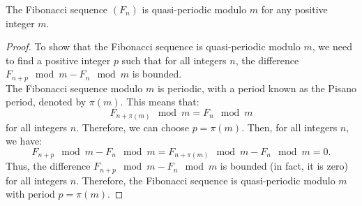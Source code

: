 \documentclass[openany]{book}
\begin{document}
\begin{mytheorem}
    The Fibonacci sequence $(F_n)$ is quasi-periodic modulo $m$ for any positive integer $m$.
\end{mytheorem}
\begin{proof}
    To show that the Fibonacci sequence is quasi-periodic modulo $m$, we need to find a positive integer $p$ such that for all integers $n$, the difference $F_{n+p} \mod m - F_n \mod m$ is bounded. \\
    The Fibonacci sequence modulo $m$ is periodic, with a period known as the Pisano period, denoted by $\pi(m)$. This means that:
    \[
        F_{n+\pi(m)} \mod m = F_n \mod m
    \]
    for all integers $n$. Therefore, we can choose $p = \pi(m)$. Then, for all integers $n$, we have:
    \[
        F_{n+p} \mod m - F_n \mod m = F_{n+\pi(m)} \mod m - F_n \mod m = 0.
    \]
    Thus, the difference $F_{n+p} \mod m - F_n \mod m$ is bounded (in fact, it is zero) for all integers $n$. Therefore, the Fibonacci sequence is quasi-periodic modulo $m$ with period $p = \pi(m)$.
\end{proof}
\end{document}
